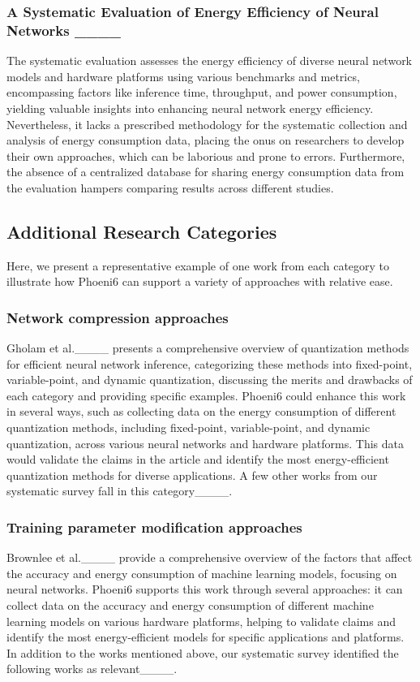 \subsubsection{A Systematic Evaluation of Energy Efficiency of Neural Networks ____} The systematic evaluation assesses the energy efficiency of diverse neural network models and hardware platforms using various benchmarks and metrics, encompassing factors like inference time, throughput, and power consumption, yielding valuable insights into enhancing neural network energy efficiency. Nevertheless, it lacks a prescribed methodology for the systematic collection and analysis of energy consumption data, placing the onus on researchers to develop their own approaches, which can be laborious and prone to errors. Furthermore, the absence of a centralized database for sharing energy consumption data from the evaluation hampers comparing results across different studies.

\subsection{Additional Research Categories}
\label{subsec:other-categories}

Here, we present a representative example of one work from each category to illustrate how Phoeni6 can support a variety of approaches with relative ease.

\subsubsection{Network compression approaches} 
Gholam et al.____ presents a comprehensive overview of quantization methods for efficient neural network inference, categorizing these methods into fixed-point, variable-point, and dynamic quantization, discussing the merits and drawbacks of each category and providing specific examples. Phoeni6 could enhance this work in several ways, such as collecting data on the energy consumption of different quantization methods, including fixed-point, variable-point, and dynamic quantization, across various neural networks and hardware platforms. This data would validate the claims in the article and identify the most energy-efficient quantization methods for diverse applications.
%
A few other works from our systematic survey fall in this category____.

\subsubsection{Training parameter modification approaches}
Brownlee et al.____ provide a comprehensive overview of the factors that affect the accuracy and energy consumption of machine learning models, focusing on neural networks. Phoeni6 supports this work through several approaches: it can collect data on the accuracy and energy consumption of different machine learning models on various hardware platforms, helping to validate claims and identify the most energy-efficient models for specific applications and platforms. 
%
In addition to the works mentioned above, our systematic survey identified the following works as relevant____.
    
